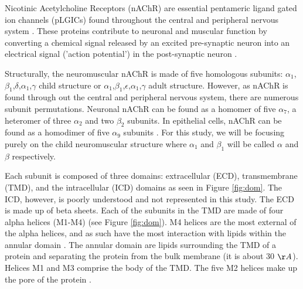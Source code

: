 \documentclass[10pt, letterpaper]{article}
\begin{document}

Nicotinic Acetylcholine Receptors (nAChR) are essential pentameric ligand gated ion channels (pLGICs) found throughout the central and peripheral nervous system \cite{miyazawastructure2003}. These proteins contribute to neuronal and muscular function by converting a chemical signal released by an excited pre-synaptic neuron into an electrical signal ('action potential') in the post-synaptic neuron \cite{kalamida_poulas_avramopoulou_fostieri_lagoumintzis_lazaridis_sideri_zouridakis_tzartos_2007}.

Structurally, the neuromuscular nAChR is made of five homologous subunits: $\alpha_{1}$,$\beta_{1}$,$\delta$,$\alpha_{1}$,$\gamma$ child structure or $\alpha_{1}$,$\beta_{1}$,$\epsilon$,$\alpha_{1}$,$\gamma$ adult structure. However, as nAChR is found through out the central and peripheral nervous system, there are numerous subunit permutations. Neuronal nAChR can be found as a homomer of five $\alpha_7$, a heteromer of three $\alpha_2$ and two $\beta_2$ subunits. In epithelial cells, nAChR can be found as a homodimer of five $\alpha_9$ subunits \cite{corringernicotinic2000}. For this study, we will be focusing purely on the child neuromuscular structure where $\alpha_1$ and $\beta_1$ will be called $\alpha$ and $\beta$ respectively.

Each subunit is composed of three domains: extracellular (ECD), transmembrane (TMD), and the intracellular (ICD) domains as seen in Figure \ref{fig:dom}. The ICD, however, is poorly understood and not represented in this study. The ECD is made up of beta sheets. Each of the subunits in the TMD are made of four alpha helices (M1-M4) (see Figure \ref{fig:dom}). M4 helices are the most external of the alpha helices, and as such have the most interaction with lipids within the annular domain \cites{branniganembedded2008}{miyazawastructure2003}. The annular domain are lipids surrounding the TMD of a protein and separating the protein from the bulk membrane (it is about 30 $\AA$). Helices M1 and M3 comprise the body of the TMD. The five M2 helices make up the pore of the protein \cites{branniganembedded2008}.
\end{document}
